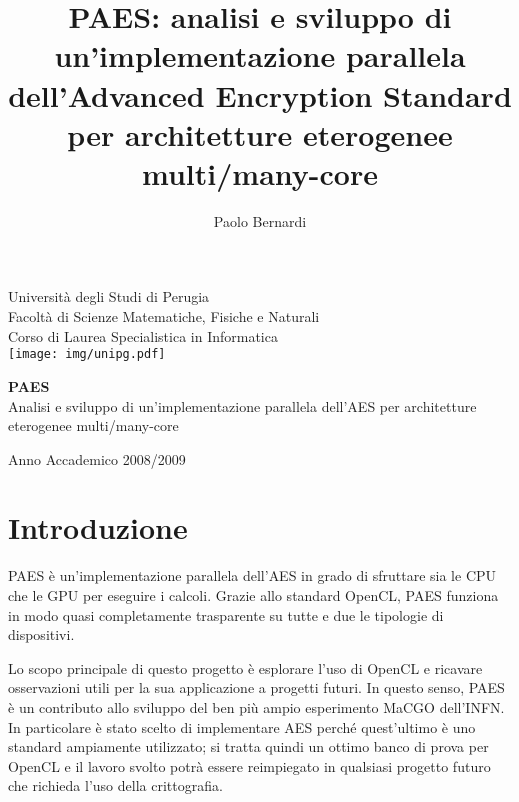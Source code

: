 \documentclass[12pt,a4paper,oneside]{book}
\author{Paolo Bernardi}
\title{PAES: analisi e sviluppo di un'implementazione parallela dell'Advanced Encryption Standard per architetture eterogenee multi/many-core}
\begin{document}
\setlength{\parindent}{0pt}
\setlength{\parskip}{1ex plus 0.5ex minus 0.2ex}
\setlength{\unitlength}{1cm}

\begin{titlepage}
\begin{center}

{\Large \sc Università  degli Studi di Perugia} \\
{\large
\vspace*{0.3 cm}
Facoltà  di Scienze Matematiche, Fisiche e Naturali \\
\vspace*{0.5 cm}
Corso di Laurea Specialistica in Informatica} \\

\vspace*{1.8 cm}
\texttt{[image: img/unipg.pdf]} \\
\vspace*{1.8 cm}
        
{\Large {\bf PAES}} \\
\vspace*{0.5 cm}
{\large Analisi e sviluppo di un'implementazione parallela 
dell'AES per architetture eterogenee multi/many-core}
\vspace*{1.5 cm}      

\large {}

\vspace{1.7 cm}
Anno Accademico 2008/2009

\end{center}
\end{titlepage}

\tableofcontents

\frontmatter
\chapter{Introduzione}

PAES è un'implementazione parallela dell'\ac{AES} in grado di sfruttare sia le \ac{CPU} che le \ac{GPU} per eseguire i calcoli. Grazie allo standard \ac{OpenCL}, PAES funziona in modo quasi completamente trasparente su tutte e due le tipologie di dispositivi.

Lo scopo principale di questo progetto è esplorare l'uso di \ac{OpenCL} e ricavare osservazioni utili per la sua applicazione a progetti futuri. In questo senso, PAES è un contributo allo sviluppo del ben più ampio esperimento \ac{MaCGO} dell'\ac{INFN}. In particolare è stato scelto di implementare \ac{AES} perché quest'ultimo è uno standard\cite{bib:fips-197} ampiamente utilizzato; si tratta quindi un ottimo banco di prova per \ac{OpenCL} e il lavoro svolto potrà essere reimpiegato in qualsiasi progetto futuro che richieda l'uso della crittografia.
\end{document}
